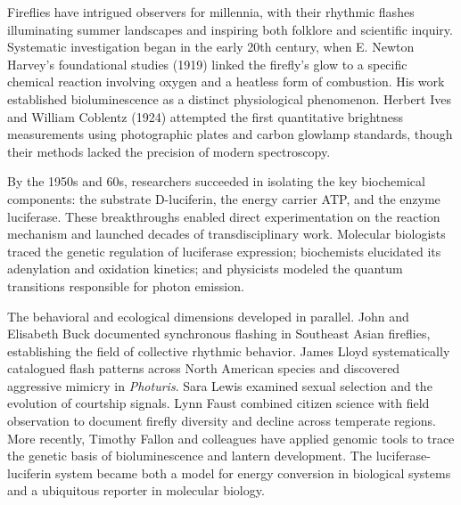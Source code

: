 \begin{historical}
Fireflies have intrigued observers for millennia, with their rhythmic flashes illuminating summer landscapes and inspiring both folklore and scientific inquiry. Systematic investigation began in the early 20th century, when E. Newton Harvey's foundational studies (1919) linked the firefly's glow to a specific chemical reaction involving oxygen and a heatless form of combustion. His work established bioluminescence as a distinct physiological phenomenon. Herbert Ives and William Coblentz (1924) attempted the first quantitative brightness measurements using photographic plates and carbon glowlamp standards, though their methods lacked the precision of modern spectroscopy.

By the 1950s and 60s, researchers succeeded in isolating the key biochemical components: the substrate D-luciferin, the energy carrier ATP, and the enzyme luciferase. These breakthroughs enabled direct experimentation on the reaction mechanism and launched decades of transdisciplinary work. Molecular biologists traced the genetic regulation of luciferase expression; biochemists elucidated its adenylation and oxidation kinetics; and physicists modeled the quantum transitions responsible for photon emission.

The behavioral and ecological dimensions developed in parallel. John and Elisabeth Buck documented synchronous flashing in Southeast Asian fireflies, establishing the field of collective rhythmic behavior. James Lloyd systematically catalogued flash patterns across North American species and discovered aggressive mimicry in \emph{Photuris}. Sara Lewis examined sexual selection and the evolution of courtship signals. Lynn Faust combined citizen science with field observation to document firefly diversity and decline across temperate regions. More recently, Timothy Fallon and colleagues have applied genomic tools to trace the genetic basis of bioluminescence and lantern development. The luciferase-luciferin system became both a model for energy conversion in biological systems and a ubiquitous reporter in molecular biology.
\end{historical}


